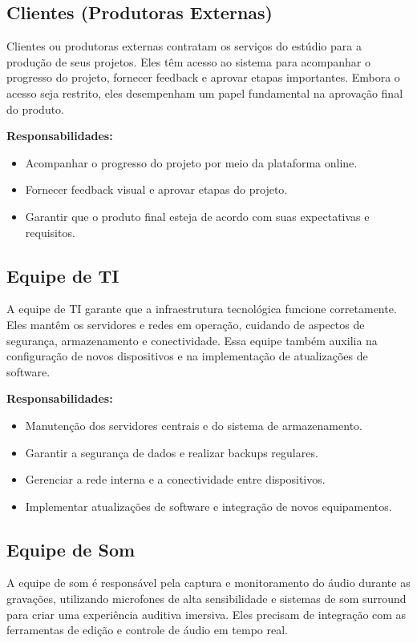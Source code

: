 \subsection{Clientes (Produtoras Externas)}
Clientes ou produtoras externas contratam os serviços do estúdio para a produção de seus projetos. Eles têm acesso ao sistema para acompanhar o progresso do projeto, fornecer feedback e aprovar etapas importantes. Embora o acesso seja restrito, eles desempenham um papel fundamental na aprovação final do produto.

\textbf{Responsabilidades:}
\begin{itemize}
  \item Acompanhar o progresso do projeto por meio da plataforma online.
  \item Fornecer feedback visual e aprovar etapas do projeto.
  \item Garantir que o produto final esteja de acordo com suas expectativas e requisitos.
\end{itemize}

\subsection{Equipe de TI}
A equipe de TI garante que a infraestrutura tecnológica funcione corretamente. Eles mantêm os servidores e redes em operação, cuidando de aspectos de segurança, armazenamento e conectividade. Essa equipe também auxilia na configuração de novos dispositivos e na implementação de atualizações de software.

\textbf{Responsabilidades:}
\begin{itemize}
  \item Manutenção dos servidores centrais e do sistema de armazenamento.
  \item Garantir a segurança de dados e realizar backups regulares.
  \item Gerenciar a rede interna e a conectividade entre dispositivos.
  \item Implementar atualizações de software e integração de novos equipamentos.
\end{itemize}

\subsection{Equipe de Som}
A equipe de som é responsável pela captura e monitoramento do áudio durante as gravações, utilizando microfones de alta sensibilidade e sistemas de som surround para criar uma experiência auditiva imersiva. Eles precisam de integração com as ferramentas de edição e controle de áudio em tempo real.

